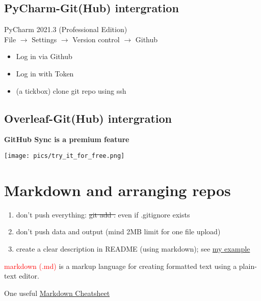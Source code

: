 \documentclass[a4paper,11pt]{article}
\begin{document}
\subsection{PyCharm-Git(Hub) intergration}

PyCharm 2021.3 (Professional Edition) \\

File $\rightarrow$ Settings $\rightarrow$ Version control $\rightarrow$ Github 

\begin{itemize}
	\item Log in via Github
	\item Log in with Token
	\item (a tickbox) clone git repo using ssh
\end{itemize}

\subsection{Overleaf-Git(Hub) intergration}

\textbf{GitHub Sync is a premium feature}

\begin{center}
	
\texttt{[image: pics/try\_it\_for\_free.png]}

\end{center}

 

\section{Markdown and arranging repos}

\begin{enumerate}
	\item don't push everything: \st{git add .} even if .gitignore exists
	\item don't push data and output (mind 2MB limit for one file upload)
	\item create a clear description in README (using markdown); see \href{https://github.com/kunilovskaya/dskills_workshop/blob/main/README.md}{my example}
\end{enumerate}

\textcolor{red}{markdown (.md)} is a markup language for creating formatted text using a plain-text editor.

One useful \href{https://github.com/adam-p/markdown-here/wiki/Markdown-Cheatsheet}{Markdown Cheatsheet} \\
\end{document}
